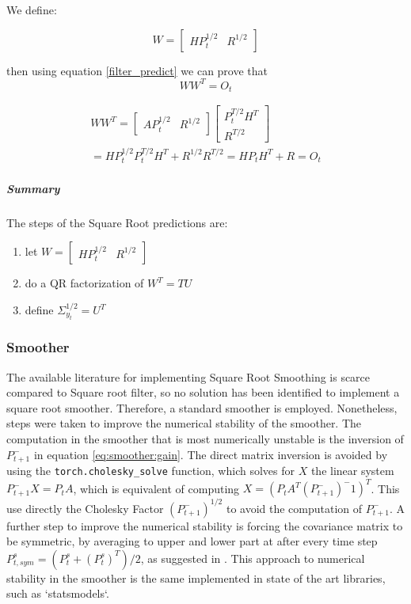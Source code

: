 \documentclass{article}
\begin{document}
We define:

\begin{equation}
    W = \begin{bmatrix}HP_{t}^{1/2} & R^{1/2}\end{bmatrix}
\end{equation}

then using equation \ref{filter_predict} we can prove that
\begin{equation}\label{predict_SR_mult}
WW^T = O_t 
\end{equation}

\begin{multline}
  WW^T =  \begin{bmatrix}AP_{t}^{1/2} & R^{1/2}\end{bmatrix}\begin{bmatrix}P_{t}^{T/2}H^T \\ R^{T/2}\end{bmatrix}\\
  = HP_{t}^{1/2}P_{t}^{T/2}H^T + R^{1/2}R^{T/2} = HP_{t}H^T + R = O_t
\end{multline}

\subparagraph{Summary} The steps of the Square Root predictions are:

\begin{enumerate}
    \item let  $W = \begin{bmatrix}HP_t^{1/2} & R^{1/2}\end{bmatrix}$
    \item do a QR factorization of $W^T=TU$
    \item define $\Sigma_{y_t}^{1/2} = U^T$
\end{enumerate}

\subsubsection{Smoother}

The available literature for implementing Square Root Smoothing is scarce compared to Square root filter, so no solution has been identified to implement a square root smoother. Therefore, a standard smoother is employed.
Nonetheless, steps were taken to improve the numerical stability of the smoother. The computation in the smoother that is most numerically unstable is the inversion of $P^-_{t+1}$ in equation \ref{eq:smoother:gain}. The direct matrix inversion is avoided by using the \verb|torch.cholesky_solve| function, which solves for $X$ the linear system $P^-_{t+1}X=P_tA$, which is equivalent of computing $X = (P_tA^T(P^-_{t+1})^-1)^T$. This use directly the Cholesky Factor $(P^-_{t+1})^{1/2}$ to avoid the computation of $P^-_{t+1}$. A further step to improve the numerical stability is forcing the covariance matrix to be symmetric, by averaging to upper and lower part at after every time step $P^s_{t, sym} = (P^s_t + (P^s_t)^T)/2$, as suggested in \cite{dan_simon_optimal_2006}.
This approach to numerical stability in the smoother is the same implemented in state of the art libraries, such as `statsmodels`.
\end{document}
